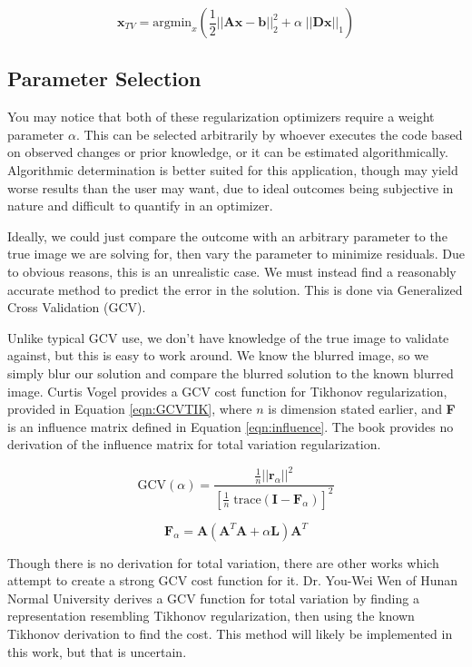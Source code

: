 \documentclass[letterpaper, 10pt, titlepage, twocolumn]{article}
\begin{document}
\begin{equation}
  \label{eqn:TV}
  \mathbf{x}_{TV}=\textrm{argmin}_x\left(\frac{1}{2}||\mathbf{Ax}-\mathbf{b}||^2_2 + \alpha\; ||\mathbf{Dx}||_1\right)
\end{equation}

\subsection*{Parameter Selection}
You may notice that both of these regularization optimizers require a weight parameter $\alpha$. This can be selected arbitrarily by whoever executes the code based on observed changes or prior knowledge, or it can be estimated algorithmically. Algorithmic determination is better suited for this application, though may yield worse results than the user may want, due to ideal outcomes being subjective in nature and difficult to quantify in an optimizer.

Ideally, we could just compare the outcome with an arbitrary parameter to the true image we are solving for, then vary the parameter to minimize residuals. Due to obvious reasons, this is an unrealistic case. We must instead find a reasonably accurate method to predict the error in the solution. This is done via Generalized Cross Validation (GCV).

Unlike typical GCV use, we don't have knowledge of the true image to validate against, but this is easy to work around. We know the blurred image, so we simply blur our solution and compare the blurred solution to the known blurred image. Curtis Vogel \cite{vogel_computational_2002} provides a GCV cost function for Tikhonov regularization, provided in Equation \eqref{eqn:GCVTIK}, where $n$ is dimension stated earlier, and \textbf{F} is an influence matrix defined in Equation \eqref{eqn:influence}. The book provides no derivation of the influence matrix for total variation regularization.

\begin{equation}
  \label{eqn:GCVTIK}
  \textrm{GCV}(\alpha)=\frac{\frac{1}{n}||\mathbf{r}_\alpha||^2}{\left[\frac{1}{n}\;\textrm{trace}(\mathbf{I}-\mathbf{F}_\alpha)\right]^2}
\end{equation}

\begin{equation}
  \label{eqn:influence}
  \mathbf{F}_\alpha = \mathbf{A}\left(\mathbf{A}^T \mathbf{A} + \alpha \mathbf{L}\right)\mathbf{A}^T
\end{equation}

Though there is no derivation for total variation, there are other works which attempt to create a strong GCV cost function for it. Dr. You-Wei Wen of Hunan Normal University \cite{wen_using_2018} derives a GCV function for total variation by finding a representation resembling Tikhonov regularization, then using the known Tikhonov derivation to find the cost. This method will likely be implemented in this work, but that is uncertain.
\end{document}
